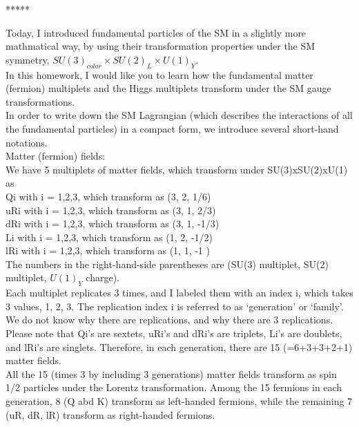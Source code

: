 \documentclass[12pt]{article}
\begin{document}
                                *****

  Today, I introduced fundamental particles of the SM in
  a slightly more mathmatical way, by using their transformation
  properties under the SM symmetry, $SU(3)_{color} \times SU(2)_L \times U(1)_Y$.\\
  
  In this homework, I would like you to learn how the fundamental
  matter (fermion) multiplets and the Higgs multiplets transform
  under the SM gauge transformations. \\

  In order to write down the SM Lagrangian (which describes the
  interactions of all the fundamental particles) in a compact form,
  we introduce several short-hand notations. \\

  Matter (fermion) fields:\\

  We have 5 multiplets of matter fields, which transform under
  SU(3)xSU(2)xU(1) as\\

  Qi  with i = 1,2,3, which transform as (3, 2,  1/6)\\
  uRi with i = 1,2,3, which transform as (3, 1,  2/3)\\
  dRi with i = 1,2,3, which transform as (3, 1, -1/3)\\
  Li  with i = 1,2,3, which transform as (1, 2, -1/2)\\
  lRi with i = 1,2,3, which transform as (1, 1, -1  )\\

  The numbers in the right-hand-side parentheses are
  (SU(3) multiplet, SU(2) multiplet, $U(1)_Y$ charge).\\

  Each multiplet replicates 3 times, and I labeled them with an
  index i, which takes 3 values, 1, 2, 3.  The replication index
  i is referred to as `generation' or `family'.  We do not know
  why there are replications, and why there are 3 replications.\\

  Please note that Qi's are sextets, uRi's and dRi's are triplets,
  Li's are doublets, and lRi's are singlets.  Therefore, in
  each generation, there are 15 (=6+3+3+2+1) matter fields.\\

  All the 15 (times 3 by including 3 generations) matter fields
  transform as spin 1/2 particles under the Lorentz transformation.
  Among the 15 fermions in each generation, 8 (Q abd K) transform
  as left-handed fermions, while the remaining 7 (uR, dR, lR)
  transform as right-handed fermions.\\
\end{document}
